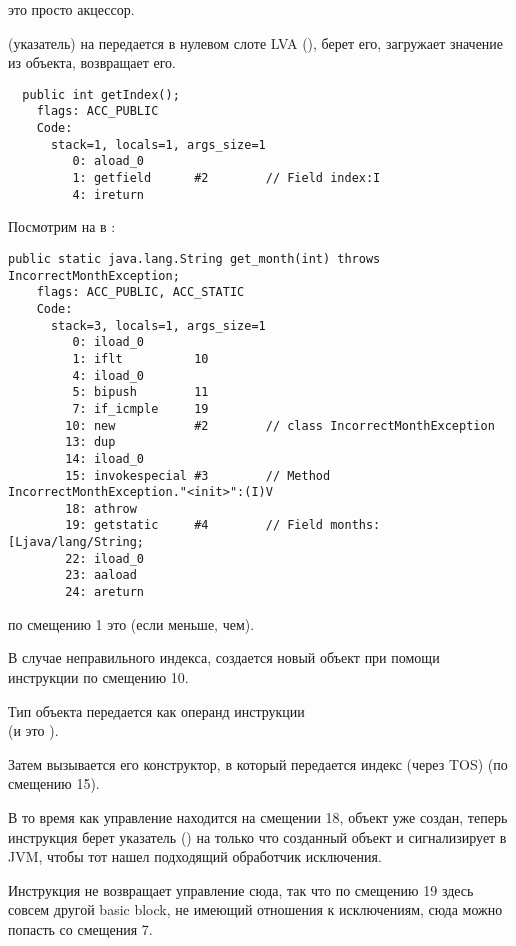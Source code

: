  это просто акцессор.

 (указатель) на  передается в нулевом слоте \ac{LVA}
(),  берет его,  загружает значение из объекта, 
 возвращает его.

\begin{lstlisting}
  public int getIndex();
    flags: ACC_PUBLIC
    Code:
      stack=1, locals=1, args_size=1
         0: aload_0       
         1: getfield      #2        // Field index:I
         4: ireturn       
\end{lstlisting}

Посмотрим на  в :

\begin{lstlisting}[caption=Month2.class]
  public static java.lang.String get_month(int) throws IncorrectMonthException;
    flags: ACC_PUBLIC, ACC_STATIC
    Code:
      stack=3, locals=1, args_size=1
         0: iload_0       
         1: iflt          10
         4: iload_0       
         5: bipush        11
         7: if_icmple     19
        10: new           #2        // class IncorrectMonthException
        13: dup           
        14: iload_0       
        15: invokespecial #3        // Method IncorrectMonthException."<init>":(I)V
        18: athrow        
        19: getstatic     #4        // Field months:[Ljava/lang/String;
        22: iload_0       
        23: aaload        
        24: areturn       
\end{lstlisting}

 по смещению 1 это  (если меньше, чем).

В случае неправильного индекса, создается новый объект при помощи инструкции  
по смещению 10.

Тип объекта передается как операнд инструкции\\
(и это ).

Затем вызывается его конструктор, в который передается индекс (через \ac{TOS}) (по смещению 15).

В то время как управление находится на смещении 18, объект уже создан,
теперь инструкция  берет указатель ()
на только что созданный объект и сигнализирует в \ac{JVM}, чтобы тот нашел подходящий обработчик
исключения.

Инструкция  не возвращает управление сюда,
так что по смещению 19 здесь совсем другой \gls{basic block},
не имеющий отношения к исключениям, сюда можно попасть со смещения 7.


